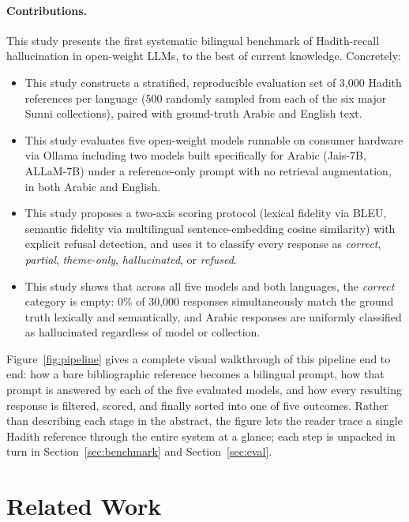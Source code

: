 \documentclass{article}
\begin{document}
\paragraph{Contributions.}
This study presents the first systematic bilingual benchmark of
Hadith-recall hallucination in open-weight LLMs, to the best of current
knowledge. Concretely:
\begin{itemize}
  \item This study constructs a stratified, reproducible evaluation set of
    3,000 Hadith references per language (500 randomly sampled from each of
    the six major Sunni collections), paired with ground-truth Arabic and
    English text.
  \item This study evaluates five open-weight models runnable on consumer
    hardware via Ollama including two models built specifically for Arabic
    (Jais-7B, ALLaM-7B) under a reference-only prompt with no retrieval
    augmentation, in both Arabic and English.
  \item This study proposes a two-axis scoring protocol (lexical fidelity via
    BLEU, semantic fidelity via multilingual sentence-embedding cosine
    similarity) with explicit refusal detection, and uses it to classify
    every response as \emph{correct}, \emph{partial}, \emph{theme-only},
    \emph{hallucinated}, or \emph{refused}.
  \item This study shows that across all five models and both languages, the
    \emph{correct} category is empty: 0\% of 30,000 responses simultaneously
    match the ground truth lexically and semantically, and Arabic responses are
    uniformly classified as hallucinated regardless of model or collection.
\end{itemize}
Figure~\ref{fig:pipeline} gives a complete visual walkthrough of this
pipeline end to end: how a bare bibliographic reference becomes a bilingual
prompt, how that prompt is answered by each of the five evaluated models,
and how every resulting response is filtered, scored, and finally sorted
into one of five outcomes. Rather than describing each stage in the
abstract, the figure lets the reader trace a single Hadith reference through
the entire system at a glance; each step is unpacked in turn in
Section~\ref{sec:benchmark} and Section~\ref{sec:eval}.

\section{Related Work}
\label{sec:related}
\end{document}
